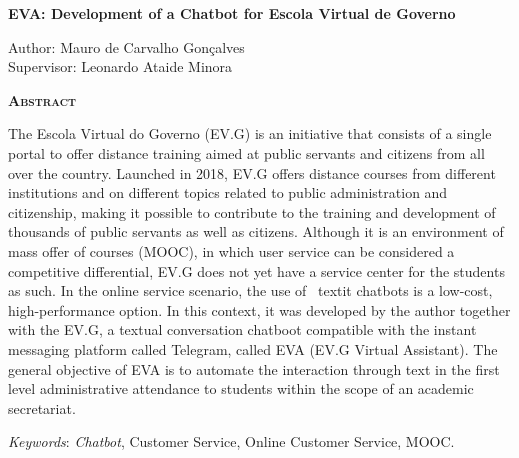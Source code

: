 \begin{center}
	{\Large{\textbf{EVA: Development of a Chatbot for Escola Virtual de Governo}}}
\end{center}

\vspace{1cm}

\begin{flushright}
	Author: Mauro de Carvalho Gonçalves\\
	Supervisor: Leonardo Ataide Minora
\end{flushright}

\vspace{1cm}

\begin{center}
	\Large{\textsc{\textbf{Abstract}}}
\end{center}

\noindent The Escola Virtual do Governo (EV.G) is an initiative that consists of a single portal to offer distance training aimed at public servants and citizens from all over the country.
Launched in 2018, EV.G offers distance courses from different institutions and on different topics related to public administration and citizenship, making it possible to contribute to the training and development of thousands of public servants as well as citizens.
Although it is an environment of mass offer of courses (MOOC), in which user service can be considered a competitive differential, EV.G does not yet have a service center for the students as such.
In the online service scenario, the use of \ textit {chatbots} is a low-cost, high-performance option.
In this context, it was developed by the author together with the EV.G, a textual conversation chatboot compatible with the instant messaging platform called Telegram, called EVA (EV.G Virtual Assistant). The general objective of EVA is to automate the interaction through text in the first level administrative attendance to students within the scope of an academic secretariat.

\noindent\textit{Keywords}: \textit{Chatbot}, Customer Service, Online Customer Service, MOOC.